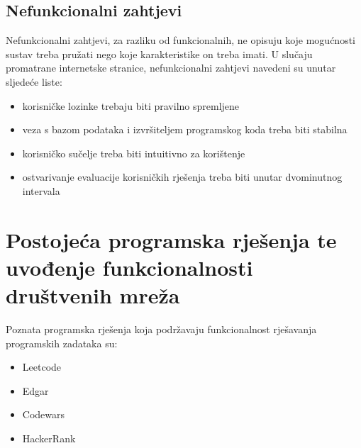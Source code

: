 \documentclass[times, utf8, zavrsni]{fer}
\begin{document}
		\section{Nefunkcionalni zahtjevi}
		Nefunkcionalni zahtjevi, za razliku od funkcionalnih, ne opisuju koje mogućnosti sustav treba pružati nego koje karakteristike on treba imati. U slučaju promatrane internetske stranice, nefunkcionalni zahtjevi navedeni su unutar sljedeće liste:
		\begin{itemize}
			\item korisničke lozinke trebaju biti pravilno spremljene
			\item veza s bazom podataka i izvršiteljem programskog koda treba biti stabilna
			\item korisničko sučelje treba biti intuitivno za korištenje
			\item ostvarivanje evaluacije korisničkih rješenja treba biti unutar dvominutnog intervala 
		\end{itemize}
	
	\chapter{Postojeća programska rješenja te uvođenje funkcionalnosti društvenih mreža}
	Poznata programska rješenja koja podržavaju funkcionalnost rješavanja programskih zadataka su:
	\begin{itemize}
		\item Leetcode
		\item Edgar
		\item Codewars
		\item HackerRank
	\end{itemize}
	
\end{document}

